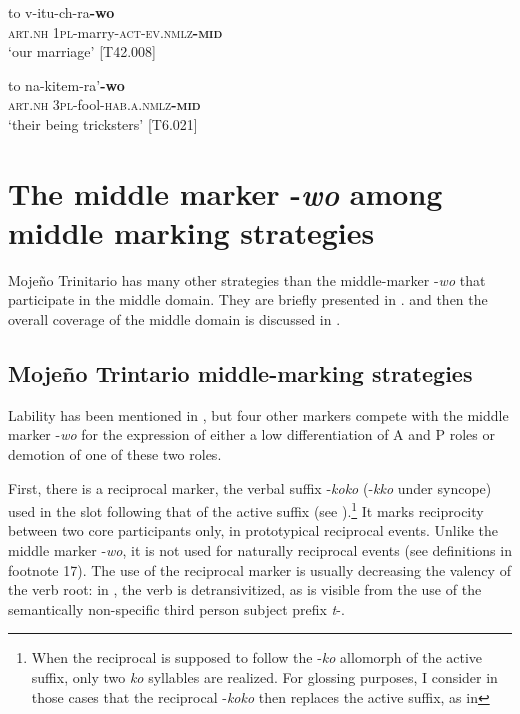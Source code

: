 \documentclass[output=paper]{langscibook}
\begin{document}
\ea
\label{ex:Rose:47}
\gll to v-itu-ch-ra\textbf{-wo}\\
\textsc{art.nh} \textsc{1pl}-marry-\textsc{act-ev.nmlz\textbf{-mid}}\\
\glt ‘our marriage’ [T42.008]
\z

\ea
\label{ex:Rose:48}
\gll to na-kitem-ra'\textbf{-wo} \\
\textsc{art.nh} \textsc{3pl}-fool-\textsc{hab.a.nmlz\textbf{-mid}}\\
\glt ‘their being tricksters’ [T6.021]
\z

\section{The middle marker -\textit{wo} among middle marking strategies}
\label{sec:Rose:6}

Mojeño Trinitario has many other strategies than the middle-marker -\textit{wo} that participate in the middle domain. They are briefly presented in . and then the overall coverage of the middle domain is discussed in .


\subsection{Mojeño Trintario middle-marking strategies}
\label{sec:Rose:6.1}

Lability has been mentioned in , but four other markers compete with the middle marker -\textit{wo} for the expression of either a low differentiation of A and P roles or demotion of one of these two roles.



First, there is a reciprocal marker, the verbal suffix -\textit{koko} (-\textit{kko} under syncope) used in the slot following that of the active suffix (see ).\footnote{When the reciprocal is supposed to follow the -\textit{ko} allomorph of the active suffix, only two \textit{ko} syllables are realized. For glossing purposes, I consider in those cases that the reciprocal -\textit{koko} then replaces the active suffix, as in } It marks reciprocity between two core participants only, in prototypical reciprocal events. Unlike the middle marker -\textit{wo}, it is not used for naturally reciprocal events (see definitions in footnote 17). The use of the reciprocal marker is usually decreasing the valency of the verb root: in , the verb is detransivitized, as is visible from the use of the semantically non-specific third person subject prefix \textit{t}-.
\end{document}
